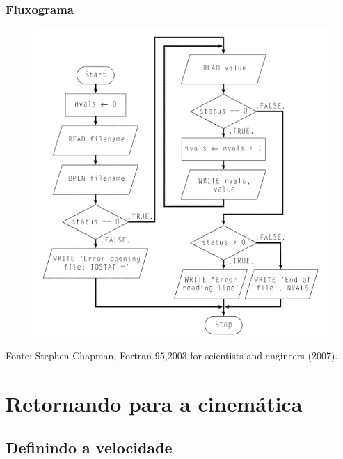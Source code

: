 \documentclass[notes=show]{beamer}
\begin{document}
\begin{frame}%

\frametitle{Fluxograma}
\begin{figure}
	\includegraphics[scale=.45]{diagrama}
\end{figure}
Fonte: Stephen Chapman, Fortran 95,2003 for scientists and engineers (2007).

\end{frame}%

\section{Retornando para a cinem\'{a}tica}
\subsection{Definindo a velocidade}
\end{document}
